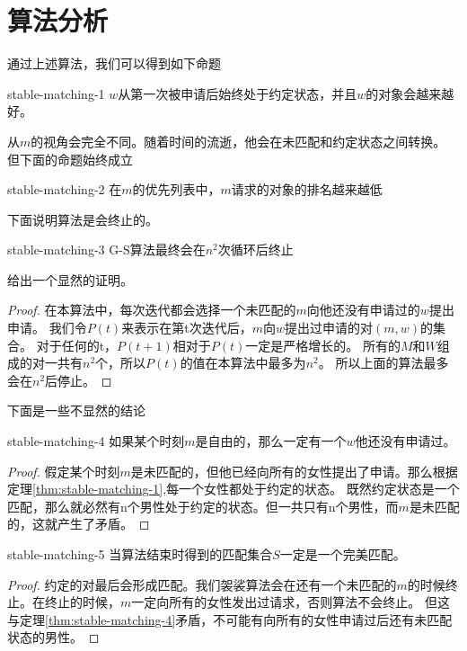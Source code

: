\section{算法分析}\label{sec:stable-matching-analyze}
    通过上述算法，我们可以得到如下命题
    \begin{theorem}{}{stable-matching-1}
    	$w$从第一次被申请后始终处于约定状态，并且$w$的对象会越来越好。
    \end{theorem}
    从$m$的视角会完全不同。随着时间的流逝，他会在未匹配和约定状态之间转换。
    但下面的命题始终成立
    \begin{theorem}{}{stable-matching-2}
        在$m$的优先列表中，$m$请求的对象的排名越来越低
    \end{theorem}
    下面说明算法是会终止的。
    \begin{theorem}{}{stable-matching-3}
        G-S算法最终会在$n^2$次循环后终止
    \end{theorem}
    给出一个显然的证明。
    \begin{proof}
        在本算法中，每次迭代都会选择一个未匹配的$m$向他还没有申请过的$w$提出申请。
        我们令$P(t)$来表示在第t次迭代后，$m$向$w$提出过申请的对$(m,w)$的集合。
        对于任何的t，$P(t+1)$相对于$P(t)$一定是严格增长的。
        所有的$M$和$W$组成的对一共有$n^2$个，所以$P(t)$的值在本算法中最多为$n^2$。
        所以上面的算法最多会在$n^2$后停止。
    \end{proof}
    下面是一些不显然的结论
    \begin{theorem}{}{stable-matching-4}
        如果某个时刻$m$是自由的，那么一定有一个$w$他还没有申请过。
    \end{theorem}
    \begin{proof}
        假定某个时刻$m$是未匹配的，但他已经向所有的女性提出了申请。那么根据定理\ref{thm:stable-matching-1},每一个女性都处于约定的状态。
        既然约定状态是一个匹配，那么就必然有n个男性处于约定的状态。但一共只有n个男性，而$m$是未匹配的，这就产生了矛盾。
    \end{proof}
    \begin{theorem}{}{stable-matching-5}
        当算法结束时得到的匹配集合$S$一定是一个完美匹配。
    \end{theorem}
    \begin{proof}
        约定的对最后会形成匹配。我们袈裟算法会在还有一个未匹配的$m$的时候终止。在终止的时候，$m$一定向所有的女性发出过请求，否则算法不会终止。
        但这与定理\ref{thm:stable-matching-4}矛盾，不可能有向所有的女性申请过后还有未匹配状态的男性。
    \end{proof}
